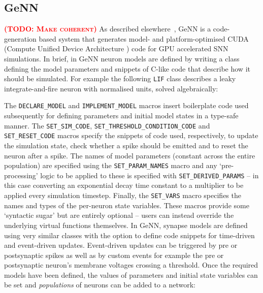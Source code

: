 \documentclass[utf8]{frontiersSCNS} %
\newcommand{\todo}[1]{\textbf{\textsc{\textcolor{red}{(TODO: #1)}}}}
\begin{document}
\subsection{GeNN}
\label{sec:method/genn}
\todo{Make coherent}
As described elsewhere~\cite{Yavuz2016}, GeNN is a code-generation based system that generates model- and platform-optimised CUDA (Compute Unified Device Architecture \cite{CUDA}) code for GPU accelerated SNN simulations.
In brief, in GeNN neuron models are defined by writing a class defining the model parameters and snippets of C-like code that describe how it should be simulated.
For example the following \lstinline{LIF} class describes a leaky integrate-and-fire neuron with normalised units, solved algebraically:



The \lstinline{DECLARE_MODEL} and \lstinline{IMPLEMENT_MODEL} macros insert boilerplate code used subsequently for defining parameters and initial model states in a type-safe manner.
The \lstinline{SET_SIM_CODE}, \lstinline{SET_THRESHOLD_CONDITION_CODE} and \lstinline{SET_RESET_CODE} macros specify the snippets of code used, respectively, to update the simulation state, check whether a spike should be emitted and to reset the neuron after a spike.
The names of model parameters (constant across the entire population) are specified using the \lstinline{SET_PARAM_NAMES} macro and any `pre-processing' logic to be applied to these is specified with \lstinline{SET_DERIVED_PARAMS} -- in this case converting an exponential decay time constant to a multiplier to be applied every simulation timestep.
Finally, the \lstinline{SET_VARS} macro specifies the names and types of the per-neuron state variables.
These macros provide some `syntactic sugar' but are entirely optional -- users can instead override the underlying virtual functions themselves.
In GeNN, synapse models are defined using very similar classes with the option to define code snippets for time-driven and event-driven updates.
Event-driven updates can be triggered by pre or postsynaptic spikes as well as by custom events for example the pre or postsynaptic neuron's membrane voltages crossing a threshold.
Once the required models have been defined, the values of parameters and initial state variables can be set and \textit{populations} of neurons can be added to a network:
%

\end{document}
